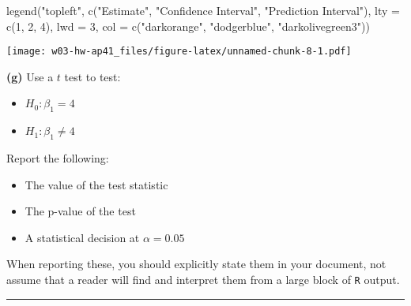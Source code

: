 \documentclass[
]{article}
\newenvironment{Shaded}{\begin{snugshade}}{\end{snugshade}}
\newcommand{\AttributeTok}[1]{\textcolor[rgb]{0.77,0.63,0.00}{#1}}
\newcommand{\DecValTok}[1]{\textcolor[rgb]{0.00,0.00,0.81}{#1}}
\newcommand{\FunctionTok}[1]{\textcolor[rgb]{0.00,0.00,0.00}{#1}}
\newcommand{\NormalTok}[1]{#1}
\newcommand{\StringTok}[1]{\textcolor[rgb]{0.31,0.60,0.02}{#1}}
\providecommand{\tightlist}{%
  \setlength{\itemsep}{0pt}\setlength{\parskip}{0pt}}
\begin{document}
\begin{Shaded}
\begin{Highlighting}[]
\FunctionTok{legend}\NormalTok{(}\StringTok{"topleft"}\NormalTok{, }\FunctionTok{c}\NormalTok{(}\StringTok{"Estimate"}\NormalTok{, }\StringTok{"Confidence Interval"}\NormalTok{, }\StringTok{"Prediction Interval"}\NormalTok{), }
       \AttributeTok{lty =} \FunctionTok{c}\NormalTok{(}\DecValTok{1}\NormalTok{, }\DecValTok{2}\NormalTok{, }\DecValTok{4}\NormalTok{),}
       \AttributeTok{lwd =} \DecValTok{3}\NormalTok{,}
       \AttributeTok{col =} \FunctionTok{c}\NormalTok{(}\StringTok{"darkorange"}\NormalTok{, }\StringTok{"dodgerblue"}\NormalTok{, }\StringTok{"darkolivegreen3"}\NormalTok{))}
\end{Highlighting}
\end{Shaded}

\texttt{[image: w03-hw-ap41\_files/figure-latex/unnamed-chunk-8-1.pdf]}

\textbf{(g)} Use a \(t\) test to test:

\begin{itemize}
\tightlist
\item
  \(H_0: \beta_1 = 4\)
\item
  \(H_1: \beta_1 \neq 4\)
\end{itemize}

Report the following:

\begin{itemize}
\tightlist
\item
  The value of the test statistic
\item
  The p-value of the test
\item
  A statistical decision at \(\alpha = 0.05\)
\end{itemize}

When reporting these, you should explicitly state them in your document,
not assume that a reader will find and interpret them from a large block
of \texttt{R} output.

\begin{center}\rule{0.5\linewidth}{0.5pt}\end{center}
\end{document}
